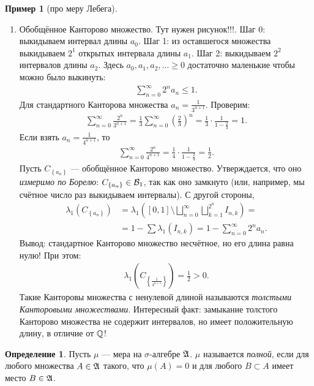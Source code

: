 \documentclass[a4paper,14pt]{extarticle}
\newcounter{theoremCnt}
\theoremstyle{definition}
\newtheorem{df}[theoremCnt]{Определение}
\theoremstyle{plain}
\theoremstyle{plain}
\theoremstyle{plain}
\theoremstyle{plain}
\theoremstyle{definition}
\newtheorem{exmpl}[theoremCnt]{Пример}
\theoremstyle{definition}
\theoremstyle{definition}
\theoremstyle{definition}
\theoremstyle{definition}
\theoremstyle{definition}
\theoremstyle{plain}
\theoremstyle{plain}
\theoremstyle{plain}
\theoremstyle{plain}
\theoremstyle{definition}
\theoremstyle{definition}
\theoremstyle{definition}
\theoremstyle{definition}
\theoremstyle{definition}
\newcommand{\Q}{\ensuremath \mathbb{Q}}
\newcommand{\A}{\ensuremath \mathfrak{A}}
\begin{document}
\begin{exmpl}[про меру Лебега]
\begin{enumerate}
\begin{proof}
\begin{align*}
    .\end{align*}
  \end{proof}
  \item Обобщённое Канторово множество. {\color{red} Тут нужен рисунок!!!}. Шаг 0:  выкидываем интервал длины $a_0$. Шаг 1: из оставшегося множества выкидываем $2^{1}$ открытых интервала длины $a_1$. Шаг 2: выкидываем $2^{2}$ интервалов длины $a_2$. Здесь $a_0, a_1, a_2, \ldots \geqslant 0$ достаточно маленькие чтобы можно было выкинуть:
  \begin{align*}
   \sum_{n=0}^{\infty} 2^{n} a_n \leqslant 1
   .\end{align*} Для стандартного Канторова множества $a_n = \frac{1}{3^{n+1}}$. Проверим:
  \begin{align*}
   \sum_{n=0}^{\infty} \frac{2^{n}}{3^{n+1}} = \frac{1}{3} \sum_{n=0}^{\infty} \left( \frac{2}{3} \right)^{n} = \frac{1}{3} \cdot \frac{1}{1 - \frac{2}{3}} = 1
   .\end{align*} Если взять $a_n = \frac{1}{4^{n+1}}$, то
  \begin{align*}
   \sum_{n=0}^{\infty} \frac{2^{n}}{4^{n+1}} = \frac{1}{4} \cdot \frac{1}{1 - \frac{2}{4}} = \frac{1}{2}
   .\end{align*} Пусть $C_{\left\{ a_n \right\}}$ --- обобщённое Канторово множество. Утверждается, что оно \textit{измеримо по Борелю}: $C_{\left\{ a_n \right\}} \in \mathcal{B}_1$, так как оно замкнуто (или, например, мы счётное число раз выкидываем интервалы). С другой стороны,
  \begin{align*}
   \lambda_1 \left( C_{\left\{ a_n \right\}} \right)
    & = \lambda_{1} \left( [0, 1] \setminus \bigsqcup_{n=0}^{\infty} \bigsqcup_{k=1}^{2^{n}} I_{n,k} \right) = \\
    & =  1 - \sum  \lambda_1(I_{n,k}) = 1 - \sum_{n=0}^{\infty} 2^{n} a_n
   .\end{align*} Вывод: стандартное Канторово множество несчётное, но его длина равна нулю! При этом:
  \begin{align*}
   \lambda_1 \left( C_{\left\{ \frac{1}{4^{n+1}} \right\}} \right) = \frac{1}{2} > 0
   .\end{align*} Такие Канторовы множества с ненулевой длиной называются \textit{толстыми Канторовыми множествами}. Интересный факт: замыкание толстого Канторово множества не содержит интервалов, но имеет положительную длину, в отличие от $\Q$!
 \end{enumerate}
\end{exmpl}
\begin{df}
 Пусть  $\mu$ --- мера на $\sigma$-алгебре $\A$. $\mu$ называется \textit{полной}, если для любого множества $A \in \A$ такого, что $\mu(A) = 0$ и для любого  $B \subset A$ имеет место $B \in \A$.
\end{df}
\end{document}
